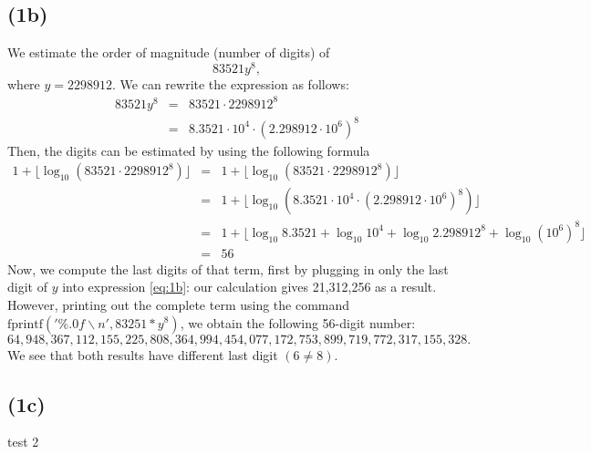 \documentclass[11pt]{article}
\newcommand{\1}{\mathbbm{1}}
\begin{document}
\subsection*{(1b)}
We estimate the order of magnitude (number of digits) of 
\begin{equation}\label{eq:1b}
83521y^8,
\end{equation}
where $y=2298912$. We can rewrite the expression as follows:
	\begin{eqnarray*}
		83521y^8 &=& 83521\cdot 2298912^8\\
				 &=& 8.3521\cdot10^4 \cdot (2.298912\cdot10^6)^8
	\end{eqnarray*}
Then, the digits can be estimated by using the following formula 
	\begin{eqnarray*}
		1+\lfloor \log_{10} (83521\cdot 2298912^8)\rfloor &=& 1+\lfloor \log_{10} (83521\cdot 2298912^8)\rfloor\\
		&=&  1+\lfloor \log_{10} (8.3521\cdot10^4 \cdot (2.298912\cdot10^6)^8)\rfloor\\
			&=&  1+\lfloor \log_{10} 8.3521+\log_{10}10^4 + \log_{10}2.298912^8 +\log_{10} (10^6)^8\rfloor\\
			&=& 56
	\end{eqnarray*} 
Now, we compute the last digits of that term, first by plugging in only the last digit of $y$ into expression \eqref{eq:1b}: our calculation gives 21,312,256 as a result. However, printing out the complete term using the command $\text{fprintf}('\%.0f\backslash n',83251*y^8)$, we obtain the following 56-digit number:
\[64,948,367,112,155,225,808,364,994,454,077,172,753,899,719,772,317,155,328.\] 
We see that both results have different last digit $(6\neq8)$.




\subsection*{(1c)}
	test 2
\end{document}
